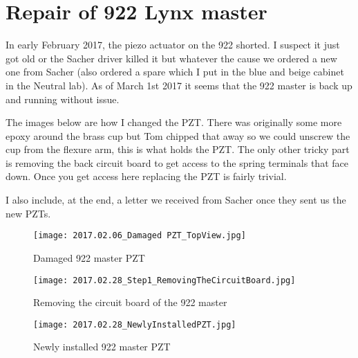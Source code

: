 \chapter{Repair of 922 Lynx master} \label{app:922repair}
In early February 2017, the piezo actuator on the 922 shorted. 
I suspect it just got old or the Sacher driver killed it but whatever the cause we ordered a new one from Sacher (also ordered a spare which I put in the blue and beige cabinet in the Neutral lab). 
As of March 1st 2017 it seems that the 922 master is back up and running without issue. 

The images below are how I changed the PZT. 
There was originally some more epoxy around the brass cup but Tom chipped that away so we could unscrew the cup from the flexure arm, this is what holds the PZT.
The only other tricky part is removing the back circuit board to get access to the spring terminals that face down.
Once you get access here replacing the PZT is fairly trivial.

I also include, at the end, a letter we received from Sacher once they sent us the new PZTs.
	\begin{figure}
		\centerline{
		\texttt{[image: 2017.02.06\_Damaged PZT\_TopView.jpg]}}
		\caption{Damaged 922 master PZT}
	\end{figure}
	\begin{figure}
		\centerline{
		\texttt{[image: 2017.02.28\_Step1\_RemovingTheCircuitBoard.jpg]}}
		\caption{Removing the circuit board of the 922 master}
	\end{figure} 
	\begin{figure}
		\centerline{
		\texttt{[image: 2017.02.28\_NewlyInstalledPZT.jpg]}}
		\caption{Newly installed 922 master PZT}
	\end{figure}





